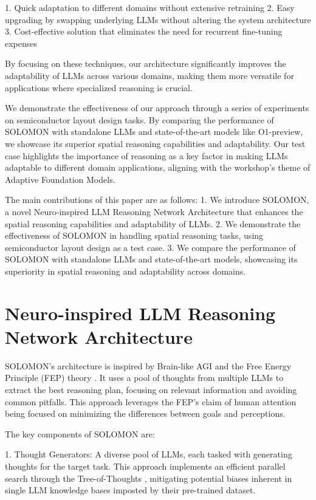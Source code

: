 \documentclass{article}
\begin{document}
1. Quick adaptation to different domains without extensive retraining
2. Easy upgrading by swapping underlying LLMs without altering the system architecture
3. Cost-effective solution that eliminates the need for recurrent fine-tuning expenses

By focusing on these techniques, our architecture significantly improves the adaptability of LLMs across various domains, making them more versatile for applications where specialized reasoning is crucial.

We demonstrate the effectiveness of our approach through a series of experiments on semiconductor layout design tasks. By comparing the performance of SOLOMON with standalone LLMs and state-of-the-art models like O1-preview, we showcase its superior spatial reasoning capabilities and adaptability. Our test case highlights the importance of reasoning as a key factor in making LLMs adaptable to different domain applications, aligning with the workshop's theme of Adaptive Foundation Models.

The main contributions of this paper are as follows:
1. We introduce SOLOMON, a novel Neuro-inspired LLM Reasoning Network Architecture that enhances the spatial reasoning capabilities and adaptability of LLMs.
2. We demonstrate the effectiveness of SOLOMON in handling spatial reasoning tasks, using semiconductor layout design as a test case.
3. We compare the performance of SOLOMON with standalone LLMs and state-of-the-art models, showcasing its superiority in spatial reasoning and adaptability across domains.

\section{Neuro-inspired LLM Reasoning Network Architecture}
SOLOMON's architecture is inspired by Brain-like AGI \cite{Byrnes2022} and the Free Energy Principle (FEP) theory \cite{Parr2022}. It uses a pool of thoughts from multiple LLMs to extract the best reasoning plan, focusing on relevant information and avoiding common pitfalls. This approach leverages the FEP's claim of human attention being focused on minimizing the differences between goals and perceptions.

The key components of SOLOMON are:

1. Thought Generators: A diverse pool of LLMs, each tasked with generating thoughts for the target task. This approach implements an efficient parallel search through the Tree-of-Thoughts \cite{yao2023treethoughtsdeliberateproblem, zhang2024cumulativereasoninglargelanguage, Besta_2024, besta2024demystifyingchainstreesgraphs}, mitigating potential biases inherent in single LLM knowledge bases imposted by their pre-trained dataset.
\end{document}
